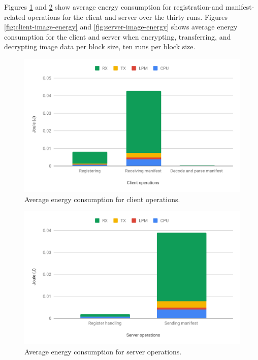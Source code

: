 \documentclass[0-thesis.tex]{subfiles}
\begin{document}
Figures \ref{fig:client-operations-energy} and \ref{fig:server-operations-energy} show
average energy consumption for registration-and manifest-related operations for the
client and server over the thirty runs. Figures \ref{fig:client-image-energy} and
\ref{fig:server-image-energy} shows average energy consumption for the client and server
when encrypting, transferring, and decrypting image data per block size, ten runs per
block size. 

\begin{figure}[]
    \caption{Average energy consumption for client operations.}
    \label{fig:client-operations-energy}
    \includegraphics[scale=0.65]{images/client-operations-energy.pdf}
\end{figure}

\begin{figure}[]
    \caption{Average energy consumption for server operations.}
    \label{fig:server-operations-energy}
    \includegraphics[scale=0.65]{images/server-operations-energy.pdf}
\end{figure}
\end{document}
